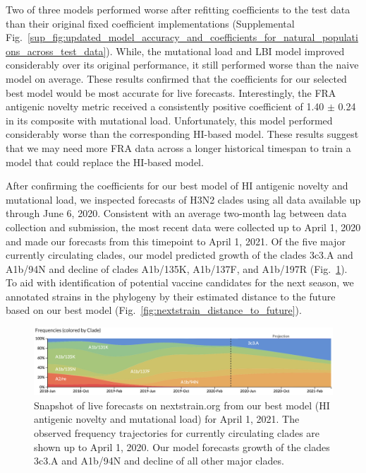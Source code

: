 Two of three models performed worse after refitting coefficients to the test data than their original fixed coefficient implementations (Supplemental Fig.~\ref{sup_fig:updated_model_accuracy_and_coefficients_for_natural_populations_across_test_data}).
While, the mutational load and LBI model improved considerably over its original performance, it still performed worse than the naive model on average.
These results confirmed that the coefficients for our selected best model would be most accurate for live forecasts.
Interestingly, the FRA antigenic novelty metric received a consistently positive coefficient of 1.40 $\pm$ 0.24 in its composite with mutational load.
Unfortunately, this model performed considerably worse than the corresponding HI-based model.
These results suggest that we may need more FRA data across a longer historical timespan to train a model that could replace the HI-based model.

After confirming the coefficients for our best model of HI antigenic novelty and mutational load, we inspected forecasts of H3N2 clades using all data available up through June 6, 2020.
Consistent with an average two-month lag between data collection and submission, the most recent data were collected up to April 1, 2020 and made our forecasts from this timepoint to April 1, 2021.
Of the five major currently circulating clades, our model predicted growth of the clades 3c3.A and A1b/94N and decline of clades A1b/135K, A1b/137F, and A1b/197R (Fig.~\ref{fig:nextstrain_forecasts}).
To aid with identification of potential vaccine candidates for the next season, we annotated strains in the phylogeny by their estimated distance to the future based on our best model (Fig.~\ref{fig:nextstrain_distance_to_future}).

\begin{figure}[htb]
  \begin{center}
  \includegraphics[width=\textwidth]{figures/nextstrain-forecasts.png}
  \caption{
    Snapshot of live forecasts on nextstrain.org from our best model (HI antigenic novelty and mutational load) for April 1, 2021.
    The observed frequency trajectories for currently circulating clades are shown up to April 1, 2020.
    Our model forecasts growth of the clades 3c3.A and A1b/94N and decline of all other major clades.
  }
  \label{fig:nextstrain_forecasts}
  \end{center}
\end{figure}

